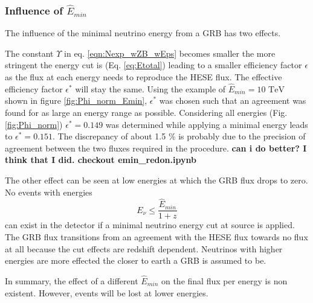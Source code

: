 \subsubsection{Influence of $\hat{E}_{min}$}
The influence of the minimal neutrino energy from a GRB has two effects.

The constant $\Upsilon$ in eq. \ref{eqn:Nexp_wZB_wEps} becomes smaller the more
stringent the energy cut is (Eq. \ref{eq:Etotal}) leading to a smaller
efficiency factor $\epsilon$ as the flux at each energy needs to
reproduce the HESE flux. The effective efficiency factor $\epsilon^*$ will stay
the same.
Using the example of $\hat{E}_{min} = 10 \text{ TeV}$ shown in figure
\ref{fig:Phi_norm_Emin}, $\epsilon^*$ was chosen such that an agreement was
found for as large an energy range as possible. Considering all energies (Fig.
\ref{fig:Phi_norm}) $\epsilon^*=0.149$ was determined while applying a minimal
energy leads to  $\epsilon^*=0.151$. The discrepancy of about 1.5 \%  is
probably due to the precision of agreement between the two fluxes required in
the procedure. \textbf{can i do better? I think that I did. checkout 
emin_redon.ipynb}

The other effect can be seen at low energies at which the GRB flux drops to
zero. No events with energies
\begin{equation}
 E_\nu \leq \frac{\hat{E}_{min}}{1+z}
\end{equation}
can exist in the detector if a minimal neutrino energy cut at source is
applied. The GRB flux transitions from an agreement with the HESE flux towards
no flux at all because the cut effects are redshift dependent. Neutrinos 
with higher
energies are more effected the  closer to earth a GRB is assumed to be.

In summary, the effect of a different $\hat{E}_{min}$ on the final flux per
energy is non existent. However, events will be lost at lower energies. 


